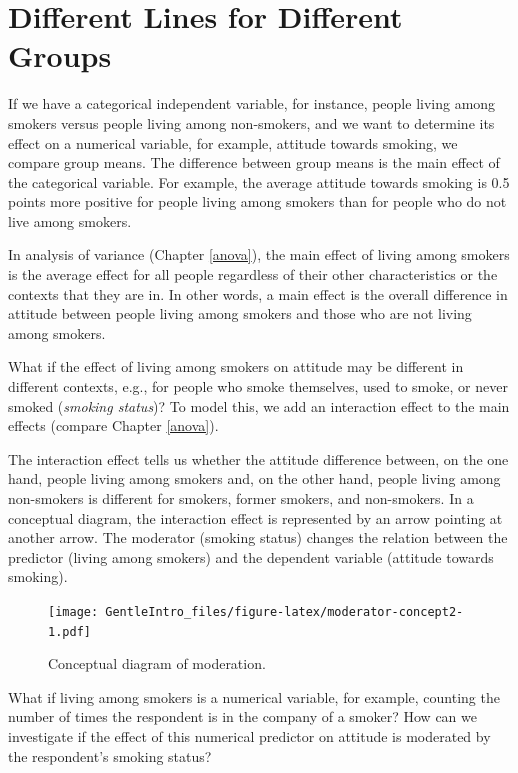 \documentclass[a4paper]{book}
\theoremstyle{definition}
\theoremstyle{definition}
\theoremstyle{definition}
\theoremstyle{remark}
\begin{document}
\section{Different Lines for Different
Groups}\label{categoricalmoderator}

If we have a categorical independent variable, for instance, people
living among smokers versus people living among non-smokers, and we want
to determine its effect on a numerical variable, for example, attitude
towards smoking, we compare group means. The difference between group
means is the main effect of the categorical variable. For example, the
average attitude towards smoking is 0.5 points more positive for people
living among smokers than for people who do not live among smokers.

In analysis of variance (Chapter \ref{anova}), the main effect of living
among smokers is the average effect for all people regardless of their
other characteristics or the contexts that they are in. In other words,
a main effect is the overall difference in attitude between people
living among smokers and those who are not living among smokers.

What if the effect of living among smokers on attitude may be different
in different contexts, e.g., for people who smoke themselves, used to
smoke, or never smoked (\emph{smoking status})? To model this, we add an
interaction effect to the main effects (compare Chapter \ref{anova}).

The interaction effect tells us whether the attitude difference between,
on the one hand, people living among smokers and, on the other hand,
people living among non-smokers is different for smokers, former
smokers, and non-smokers. In a conceptual diagram, the interaction
effect is represented by an arrow pointing at another arrow. The
moderator (smoking status) changes the relation between the predictor
(living among smokers) and the dependent variable (attitude towards
smoking).

\begin{figure}
\centering
\texttt{[image: GentleIntro\_files/figure-latex/moderator-concept2-1.pdf]}
\caption{\label{fig:moderator-concept2}Conceptual diagram of moderation.}
\end{figure}

What if living among smokers is a numerical variable, for example,
counting the number of times the respondent is in the company of a
smoker? How can we investigate if the effect of this numerical predictor
on attitude is moderated by the respondent's smoking status?
\end{document}
